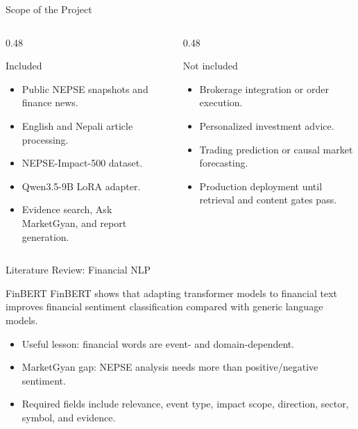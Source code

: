 \documentclass[aspectratio=169,11pt]{beamer}
\begin{document}
\begin{frame}{Scope of the Project}
  \begin{columns}[T,onlytextwidth]
    \begin{column}{0.48\textwidth}
      \begin{block}{Included}
        \begin{itemize}
          \item Public NEPSE snapshots and finance news.
          \item English and Nepali article processing.
          \item NEPSE-Impact-500 dataset.
          \item Qwen3.5-9B LoRA adapter.
          \item Evidence search, Ask MarketGyan, and report generation.
        \end{itemize}
      \end{block}
    \end{column}
    \begin{column}{0.48\textwidth}
      \begin{alertblock}{Not included}
        \begin{itemize}
          \item Brokerage integration or order execution.
          \item Personalized investment advice.
          \item Trading prediction or causal market forecasting.
          \item Production deployment until retrieval and content gates pass.
        \end{itemize}
      \end{alertblock}
    \end{column}
  \end{columns}
\end{frame}

\begin{frame}{Literature Review: Financial NLP}
  \begin{block}{FinBERT}
    FinBERT shows that adapting transformer models to financial text improves financial sentiment classification compared with generic language models.
  \end{block}
  \begin{itemize}
    \item Useful lesson: financial words are event- and domain-dependent.
    \item MarketGyan gap: NEPSE analysis needs more than positive/negative sentiment.
    \item Required fields include relevance, event type, impact scope, direction, sector, symbol, and evidence.
  \end{itemize}
\end{frame}
\end{document}
